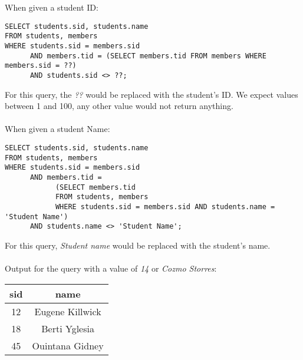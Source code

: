 \documentclass[11pt,letterpaper]{article}
\begin{document}
\begin{enumerate}
When given a student ID:
\begin{verbatim}
SELECT students.sid, students.name 
FROM students, members 
WHERE students.sid = members.sid 
      AND members.tid = (SELECT members.tid FROM members WHERE members.sid = ??) 
      AND students.sid <> ??;
\end{verbatim}
For this query, the \textit{??} would be replaced with the student's ID. We expect values between 1 and 100, any other value would not return anything.\\
\\
When given a student Name:
\begin{verbatim}
SELECT students.sid, students.name 
FROM students, members 
WHERE students.sid = members.sid 
      AND members.tid = 
            (SELECT members.tid 
            FROM students, members 
            WHERE students.sid = members.sid AND students.name = 'Student Name') 
      AND students.name <> 'Student Name';
\end{verbatim}
For this query, \textit{Student name} would be replaced with the student's name.\\
\\
Output for the query with a value of \textit{14} or \textit{Cozmo Storres}:
\begin{center}
\begin{tabular}{ | c | c | }
 \hline
 sid & name \\
 \hline
 12 & Eugene Killwick \\
 18 & Berti Yglesia \\
 45 & Ouintana Gidney \\
 \hline
\end{tabular}
\end{center}

\end{enumerate}
\end{document}
